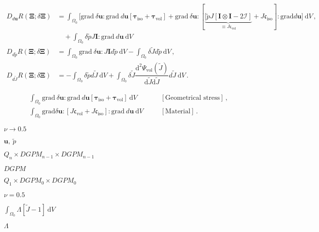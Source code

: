 \documentclass{article}
\begin{document}
\begin{align*} D_{d \mathbf{u}} R( \mathbf{\Xi}; \delta \mathbf{\Xi}) &= \int_{\Omega_0} \bigl[ \textrm{grad}\ \delta \mathbf{u} : \textrm{grad}\ d \mathbf{u} [\boldsymbol{\tau}_{\textrm{iso}} + \boldsymbol{\tau}_{\textrm{vol}}] + \textrm{grad}\ \delta \mathbf{u} :[ \underbrace{[\widetilde{p}J[\mathbf{I}\otimes\mathbf{I} - 2 \mathcal{I}]}_{\equiv J\mathfrak{c}_{\textrm{vol}}} + J\mathfrak{c}_{\textrm{iso}}] :\textrm{grad} d \mathbf{u} \bigr]~\textrm{d}V \, , \\ &\quad + \int_{\Omega_0} \delta \widetilde{p} J \mathbf{I} : \textrm{grad}\ d \mathbf{u} ~\textrm{d}V \\ D_{d \widetilde{p}} R( \mathbf{\Xi}; \delta \mathbf{\Xi}) &= \int_{\Omega_0} \textrm{grad}\ \delta \mathbf{u} : J \mathbf{I} d \widetilde{p} ~\textrm{d}V - \int_{\Omega_0} \delta \widetilde{J} d \widetilde{p} ~\textrm{d}V \, , \\ D_{d \widetilde{J}} R( \mathbf{\Xi}; \delta \mathbf{\Xi}) &= -\int_{\Omega_0} \delta \widetilde{p} d \widetilde{J}~\textrm{d}V + \int_{\Omega_0} \delta \widetilde{J} \dfrac{\textrm{d}^2 \Psi_{\textrm{vol}}(\widetilde{J})}{\textrm{d} \widetilde{J}\textrm{d}\widetilde{J}} d \widetilde{J} ~\textrm{d}V \, . \end{align*}
\pagebreak

\begin{align*} & \int_{\Omega_0} \textrm{grad}\ \delta \mathbf{u} : \textrm{grad}\ d \mathbf{u} [\boldsymbol{\tau}_{\textrm{iso}} + \boldsymbol{\tau}_{\textrm{vol}}]~\textrm{d}V && \quad {[\textrm{Geometrical stress}]} \, , \\ & \int_{\Omega_0} \textrm{grad} \delta \mathbf{u} : [J\mathfrak{c}_{\textrm{vol}} + J\mathfrak{c}_{\textrm{iso}}] :\textrm{grad}\ d \mathbf{u} ~\textrm{d}V && \quad {[\textrm{Material}]} \, . \end{align*}
\pagebreak

$\nu \rightarrow 0.5$
\pagebreak

$\mathbf{u},~\widetilde{p}$
\pagebreak

$Q_n \times DGPM_{n-1} \times DGPM_{n-1}$
\pagebreak

$DGPM$
\pagebreak

$Q_1 \times DGPM_0 \times DGPM_0$
\pagebreak

$\nu = 0.5$
\pagebreak

$\int_{\Omega_0} \Lambda [ \widetilde{J} - 1]~\textrm{d}V$
\pagebreak

$\Lambda$
\pagebreak
\end{document}
